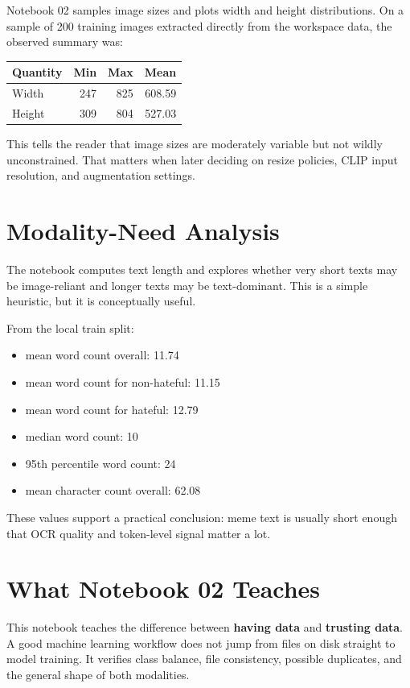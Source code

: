 \documentclass[11pt,a4paper]{report}
\begin{document}
Notebook 02 samples image sizes and plots width and height distributions. On a sample of 200 training images extracted directly from the workspace data, the observed summary was:

\begin{center}
\begin{tabular}{lrrr}
\toprule
Quantity & Min & Max & Mean \\
\midrule
Width & 247 & 825 & 608.59 \\
Height & 309 & 804 & 527.03 \\
\bottomrule
\end{tabular}
\end{center}

This tells the reader that image sizes are moderately variable but not wildly unconstrained. That matters when later deciding on resize policies, CLIP input resolution, and augmentation settings.

\section{Modality-Need Analysis}

The notebook computes text length and explores whether very short texts may be image-reliant and longer texts may be text-dominant. This is a simple heuristic, but it is conceptually useful.

From the local train split:

\begin{itemize}
\item mean word count overall: 11.74
\item mean word count for non-hateful: 11.15
\item mean word count for hateful: 12.79
\item median word count: 10
\item 95th percentile word count: 24
\item mean character count overall: 62.08
\end{itemize}

These values support a practical conclusion: meme text is usually short enough that OCR quality and token-level signal matter a lot.

\section{What Notebook 02 Teaches}

This notebook teaches the difference between \textbf{having data} and \textbf{trusting data}. A good machine learning workflow does not jump from files on disk straight to model training. It verifies class balance, file consistency, possible duplicates, and the general shape of both modalities.
\end{document}
